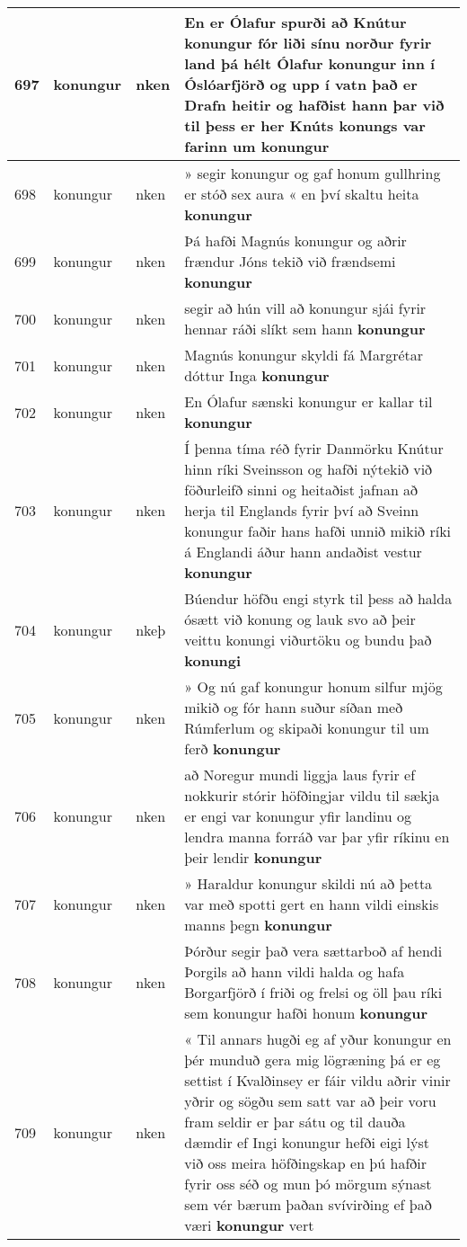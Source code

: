 \documentclass{article}
\begin{document}
\begin{longtable}{p{1cm}|p{1cm}|p{1cm}|p{13cm}}
\hline
697&konungur&nken&En er Ólafur spurði að Knútur konungur fór liði sínu norður fyrir land þá hélt Ólafur konungur inn í Óslóarfjörð og upp í vatn það er Drafn heitir og hafðist hann þar við til þess er her Knúts konungs var farinn um \textbf{konungur} \\
\hline
698&konungur&nken&» segir konungur og gaf honum gullhring er stóð sex aura « en því skaltu heita \textbf{konungur} \\
\hline
699&konungur&nken&Þá hafði Magnús konungur og aðrir frændur Jóns tekið við frændsemi \textbf{konungur} \\
\hline
700&konungur&nken&segir að hún vill að konungur sjái fyrir hennar ráði slíkt sem hann \textbf{konungur} \\
\hline
701&konungur&nken&Magnús konungur skyldi fá Margrétar dóttur Inga \textbf{konungur} \\
\hline
702&konungur&nken&En Ólafur sænski konungur er kallar til \textbf{konungur} \\
\hline
703&konungur&nken&Í þenna tíma réð fyrir Danmörku Knútur hinn ríki Sveinsson og hafði nýtekið við föðurleifð sinni og heitaðist jafnan að herja til Englands fyrir því að Sveinn konungur faðir hans hafði unnið mikið ríki á Englandi áður hann andaðist vestur \textbf{konungur} \\
\hline
704&konungur&nkeþ&Búendur höfðu engi styrk til þess að halda ósætt við konung og lauk svo að þeir veittu konungi viðurtöku og bundu það \textbf{konungi} \\
\hline
705&konungur&nken&» Og nú gaf konungur honum silfur mjög mikið og fór hann suður síðan með Rúmferlum og skipaði konungur til um ferð \textbf{konungur} \\
\hline
706&konungur&nken&að Noregur mundi liggja laus fyrir ef nokkurir stórir höfðingjar vildu til sækja er engi var konungur yfir landinu og lendra manna forráð var þar yfir ríkinu en þeir lendir \textbf{konungur} \\
\hline
707&konungur&nken&» Haraldur konungur skildi nú að þetta var með spotti gert en hann vildi einskis manns þegn \textbf{konungur} \\
\hline
708&konungur&nken&Þórður segir það vera sættarboð af hendi Þorgils að hann vildi halda og hafa Borgarfjörð í friði og frelsi og öll þau ríki sem konungur hafði honum \textbf{konungur} \\
\hline
709&konungur&nken&« Til annars hugði eg af yður konungur en þér munduð gera mig lögræning þá er eg settist í Kvalðinsey er fáir vildu aðrir vinir yðrir og sögðu sem satt var að þeir voru fram seldir er þar sátu og til dauða dæmdir ef Ingi konungur hefði eigi lýst við oss meira höfðingskap en þú hafðir fyrir oss séð og mun þó mörgum sýnast sem vér bærum þaðan svívirðing ef það væri \textbf{konungur} vert\\

\end{longtable}
\end{document}
